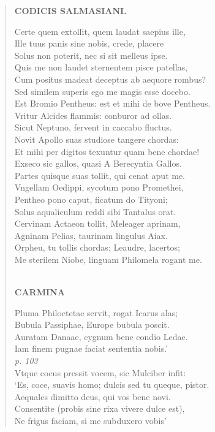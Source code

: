 \documentclass[11pt, a4paper]{report}
\begin{document}
\begin{verse}
    \begin{center} \textbf{CODICIS SALMASIANI.} \end{center} \marginpar{[169]} Certe quem extollit, quem laudat saepius ille, \\ Ille tuus panis sine nobis, crede, placere \\ Solus non poterit, nec si sit melleus ipse. \\ Quis me non laudet sternentem pisce patellas, \\ Cum positus madeat deceptus ab aequore rombus? \\ Sed similem superis ego me magis esse docebo. \\ Est Bromio Pentheus: est et mihi de bove Pentheus. \\ Vritur Alcides flammis: conburor ad ollas. \\ Sicut Neptuno, fervent in caccabo fluctus. \\ Novit Apollo suas studiose tangere chordas: \\ Et mihi per digitos texuntur quam bene chordae! \\ Exseco sic gallos, quasi A Berecyntia Gallos. \\ Partes quisque suas tollit, qui cenat aput me. \\ Vngellam Oedippi, sycotum pono Promethei, \\ Pentheo pono caput, ficatum do Tityoni; \\ Solus aqualiculum reddi sibi Tantalus orat. \\ Cervinam Actaeon tollit, Meleager aprinam, \\ Agninam Pelias, taurinam lingulus Aiax. \\ Orpheu, tu tollis chordas; Leaudre, lacertos; \\ Me sterilem Niobe, linguam Philomela rogant me. \\ 
        ﻿\pagebreak 
    \begin{center} \textbf{CARMINA} \end{center} \marginpar{[170]} Pluma Philoctetae servit, rogat Icarus alas; \\ Bubula Passiphae, Europe bubula poscit. \\ Auratam Danaae, cygnum bene condio Ledae. \\ Iam finem pugnae faciat sententia nobis.’ \\ \textit{p. 103} \\ Vtque cocus pressit vocem, sic Mulciber infit: \\ ‘Es, coce, suavis homo; dulcis sed tu queque, pistor. \\ Aequales dimitto deus, qui vos bene novi. \\ Consentite (probis sine rixa vivere dulce est), \\ Ne frigus faciam, si me subduxero vobis’ \\ 
      \end{verse}
  
\end{document}
